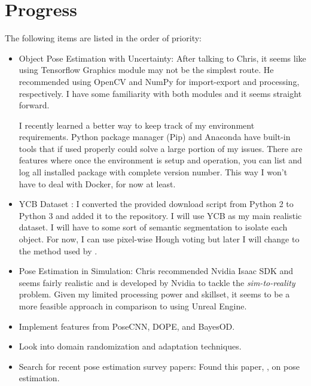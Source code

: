 \documentclass[11pt]{article}
\begin{document}
\section{Progress}
The following items are listed in the order of priority:
\begin{itemize}
      \item Object Pose Estimation with Uncertainty: After talking to Chris, it
      seems like using Tensorflow Graphics module may not be the simplest
      route. He recommended using  OpenCV and NumPy for import-export and
      processing, respectively. I have some familiarity with both modules and
      it seems straight forward.

      I recently learned a better way to keep track of my environment
      requirements. Python package manager (Pip) and Anaconda have built-in
      tools that if used properly could solve a large portion of my issues.
      There are features where once the environment is setup and operation,
      you can list and log all installed package with complete version number.
      This way I won't have to deal with Docker, for now at least.

      \item YCB Dataset \cite{calli2015ycb}: I converted the provided download
      script from Python 2 to Python 3 and added it to the repository. I will
      use YCB as my main realistic dataset. I will have to some sort of
      semantic segmentation to isolate each object. For now, I can use
      pixel-wise Hough voting but later I will change to the method used by
      \cite{Wang_2019_CVPR}.

      \item Pose Estimation in Simulation: Chris recommended Nvidia Isaac SDK
      \cite{NVIDIAIs75:online} and seems fairly realistic and is developed by
      Nvidia to tackle the \textit{sim-to-reality} problem. Given my limited
      processing power and skillset, it seems to be a more feasible approach in
      comparison to using Unreal Engine.

      \item Implement features from PoseCNN, DOPE, and BayesOD.
      \item Look into domain randomization and adaptation techniques.
      \item Search for recent pose estimation survey papers: Found this paper,
      \cite{du2020vision}, on pose estimation.

\end{itemize}
\end{document}
